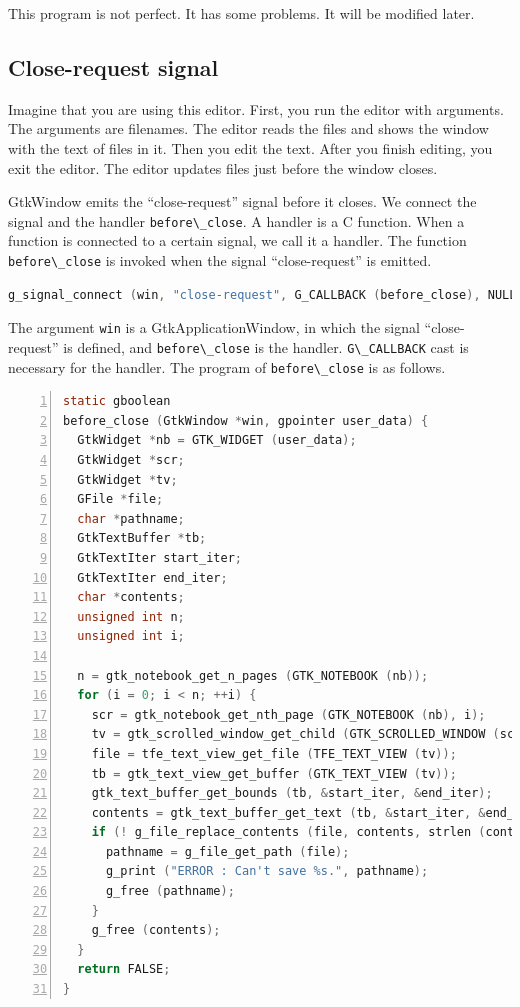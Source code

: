 This program is not perfect. It has some problems. It will be modified
later.

\hypertarget{close-request-signal}{%
\subsection{Close-request signal}\label{close-request-signal}}

Imagine that you are using this editor. First, you run the editor with
arguments. The arguments are filenames. The editor reads the files and
shows the window with the text of files in it. Then you edit the text.
After you finish editing, you exit the editor. The editor updates files
just before the window closes.

GtkWindow emits the ``close-request'' signal before it closes. We
connect the signal and the handler
\passthrough{\lstinline!before\_close!}. A handler is a C function. When
a function is connected to a certain signal, we call it a handler. The
function \passthrough{\lstinline!before\_close!} is invoked when the
signal ``close-request'' is emitted.

\begin{lstlisting}[language=C]
g_signal_connect (win, "close-request", G_CALLBACK (before_close), NULL);
\end{lstlisting}

The argument \passthrough{\lstinline!win!} is a GtkApplicationWindow, in
which the signal ``close-request'' is defined, and
\passthrough{\lstinline!before\_close!} is the handler.
\passthrough{\lstinline!G\_CALLBACK!} cast is necessary for the handler.
The program of \passthrough{\lstinline!before\_close!} is as follows.

\begin{lstlisting}[language=C, numbers=left]
static gboolean
before_close (GtkWindow *win, gpointer user_data) {
  GtkWidget *nb = GTK_WIDGET (user_data);
  GtkWidget *scr;
  GtkWidget *tv;
  GFile *file;
  char *pathname;
  GtkTextBuffer *tb;
  GtkTextIter start_iter;
  GtkTextIter end_iter;
  char *contents;
  unsigned int n;
  unsigned int i;

  n = gtk_notebook_get_n_pages (GTK_NOTEBOOK (nb));
  for (i = 0; i < n; ++i) {
    scr = gtk_notebook_get_nth_page (GTK_NOTEBOOK (nb), i);
    tv = gtk_scrolled_window_get_child (GTK_SCROLLED_WINDOW (scr));
    file = tfe_text_view_get_file (TFE_TEXT_VIEW (tv));
    tb = gtk_text_view_get_buffer (GTK_TEXT_VIEW (tv));
    gtk_text_buffer_get_bounds (tb, &start_iter, &end_iter);
    contents = gtk_text_buffer_get_text (tb, &start_iter, &end_iter, FALSE);
    if (! g_file_replace_contents (file, contents, strlen (contents), NULL, TRUE, G_FILE_CREATE_NONE, NULL, NULL, NULL)) {
      pathname = g_file_get_path (file);
      g_print ("ERROR : Can't save %s.", pathname);
      g_free (pathname);
    }
    g_free (contents);
  }
  return FALSE;
}
\end{lstlisting}


